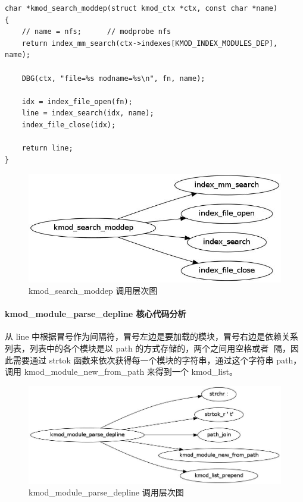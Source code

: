 \documentclass[11pt,a4paper]{article}
\makeatletter
\def\maxwidth{\ifdim\Gin@nat@width>\linewidth\linewidth
\else\Gin@nat@width\fi}
\let\Oldincludegraphics\includegraphics
\renewcommand{\includegraphics}[1]{\Oldincludegraphics[width=\maxwidth]{#1}}
\makeatother
\begin{document}
{\begin{shaded}\begin{verbatim}
char *kmod_search_moddep(struct kmod_ctx *ctx, const char *name)
{
    // name = nfs;      // modprobe nfs
    return index_mm_search(ctx->indexes[KMOD_INDEX_MODULES_DEP], name);

    DBG(ctx, "file=%s modname=%s\n", fn, name);

    idx = index_file_open(fn);
    line = index_search(idx, name);
    index_file_close(idx);

    return line;
}
\end{verbatim}\end{shaded}}
\begin{figure}[htbp]
\centering
\includegraphics{./figures/kmod_search_moddep.jpg}
\caption{kmod\_search\_moddep 调用层次图}
\end{figure}

\paragraph{kmod\_module\_parse\_depline 核心代码分析}

从 line
中根据冒号作为间隔符，冒号左边是要加载的模块，冒号右边是依赖关系列表，列表中的各个模块是以
path 的方式存储的，两个之间用空格或者 \t 间隔，因此需要通过 strtok
函数来依次获得每一个模块的字符串，通过这个字符串 path，调用
kmod\_module\_new\_from\_path 来得到一个 kmod\_list。

\begin{figure}[htbp]
\centering
\includegraphics{./figures/kmod_module_parse_depline.jpg}
\caption{kmod\_module\_parse\_depline 调用层次图}
\end{figure}
\end{document}
